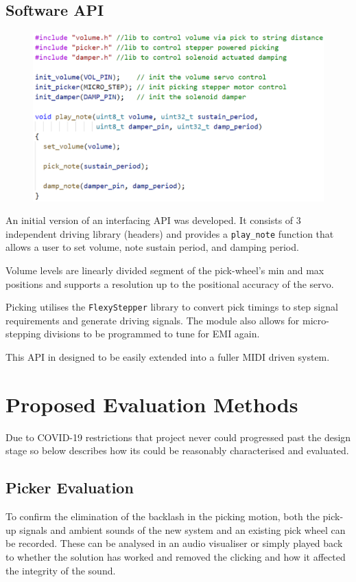 \documentclass[a4paper,11pt]{article}
\begin{document}
\subsection{Software API}

\begin{figure} [h!]
  \begin{center}
    \includegraphics[width=.6\textwidth]{images/code.png}
  \end{center}
\end{figure}

An initial version of an  interfacing API was developed. It consists of 3 independent driving library (headers) and provides a \texttt{play\_note} function that allows a user to set volume, note sustain period, and damping period.    

Volume levels are linearly divided segment of the pick-wheel's min and max positions and supports a resolution up to the positional accuracy of the servo.

Picking utilises the \texttt{FlexyStepper} library to convert pick timings to step signal requirements and generate driving signals. The module also allows for micro-stepping divisions to be programmed to tune for EMI again. 

This API in designed to be easily extended into a fuller MIDI driven system. 

\section{Proposed Evaluation Methods}

Due to COVID-19 restrictions that project never could progressed past the design stage so below describes how its could be reasonably characterised and evaluated. 

\subsection{Picker Evaluation}

To confirm the elimination of the backlash in the picking motion, both the pick-up signals and ambient sounds of the new system and an existing pick wheel can be recorded.
These can be analysed in an audio visualiser or simply played back to whether the solution has worked and removed the clicking and how it affected the integrity of the sound.
\end{document}
